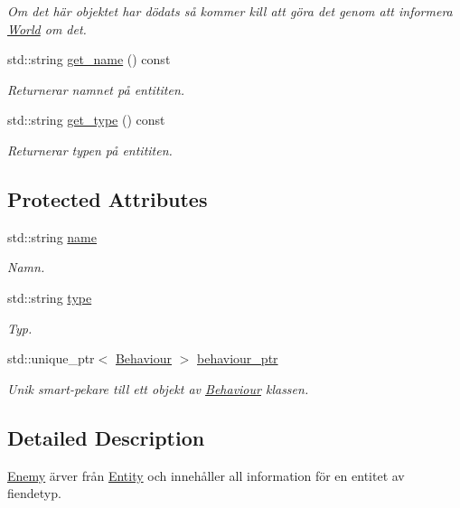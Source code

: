 \begin{DoxyCompactItemize}
\begin{DoxyCompactList}\small\item\em Om det här objektet har dödats så kommer kill att göra det genom att informera \hyperlink{classWorld}{World} om det. \end{DoxyCompactList}\item 
std\+::string \hyperlink{classEntity_a75c7e4aad3df2e053ee5b43169509534}{get\+\_\+name} () const 
\begin{DoxyCompactList}\small\item\em Returnerar namnet på entititen. \end{DoxyCompactList}\item 
std\+::string \hyperlink{classEntity_a0e9ef479c1147e21e5bcb338cb858df2}{get\+\_\+type} () const 
\begin{DoxyCompactList}\small\item\em Returnerar typen på entititen. \end{DoxyCompactList}\end{DoxyCompactItemize}
\subsection*{Protected Attributes}
\begin{DoxyCompactItemize}
\item 
std\+::string \hyperlink{classEntity_a931b21fbdebb1a5963b4bcab5df128f5}{name}
\begin{DoxyCompactList}\small\item\em Namn. \end{DoxyCompactList}\item 
std\+::string \hyperlink{classEntity_a298a9ebf2474bb00874b5ff6a0d637ef}{type}
\begin{DoxyCompactList}\small\item\em Typ. \end{DoxyCompactList}\item 
std\+::unique\+\_\+ptr$<$ \hyperlink{classBehaviour}{Behaviour} $>$ \hyperlink{classEntity_adb6e36848db24e6d48e6d295e19d3972}{behaviour\+\_\+ptr}
\begin{DoxyCompactList}\small\item\em Unik smart-\/pekare till ett objekt av \hyperlink{classBehaviour}{Behaviour} klassen. \end{DoxyCompactList}\end{DoxyCompactItemize}


\subsection{Detailed Description}
\hyperlink{classEnemy}{Enemy} ärver från \hyperlink{classEntity}{Entity} och innehåller all information för en entitet av fiendetyp. 

